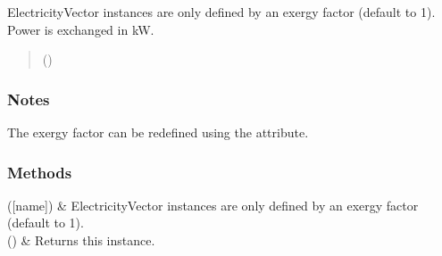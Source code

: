 \documentclass[letterpaper,10pt,english]{sphinxmanual}
\begin{document}
\begin{fulllineitems}
\label{\detokenize{generated/tamos.element.ElectricityVector:tamos.element.ElectricityVector}}
\pysigstartsignatures
{}
\pysigstopsignatures{}

\begin{fulllineitems}
\label{\detokenize{generated/tamos.element.ElectricityVector:tamos.element.ElectricityVector.__init__}}
\pysigstartsignatures
{}
\pysigstopsignatures
\sphinxAtStartPar
ElectricityVector instances are only defined by an exergy factor (default to 1).
Power is exchanged in kW.
\begin{quote}\begin{description}
\sphinxAtStartPar
{} (\sphinxstyleliteralemphasis{\sphinxupquote{, }}) \textendash{} 

\end{description}\end{quote}
\subsubsection*{Notes}

\sphinxAtStartPar
The exergy factor can be redefined using the  attribute.

\end{fulllineitems}

\subsubsection*{Methods}


\begin{savenotes}\sphinxattablestart
\centering
\begin{tabulary}{\linewidth}[t]{}
\hline

\sphinxAtStartPar
{\hyperref[\detokenize{generated/tamos.element.ElectricityVector:tamos.element.ElectricityVector.__init__}]{}}({[}name{]})
&
\sphinxAtStartPar
ElectricityVector instances are only defined by an exergy factor (default to 1).
\\
\hline
\sphinxAtStartPar
{\hyperref[\detokenize{generated/tamos.element.ElectricityVector:tamos.element.ElectricityVector.get_vectors}]{}}()
&
\sphinxAtStartPar
Returns this instance.
\\
\hline
\end{tabulary}
\par
\sphinxattableend\end{savenotes}

\end{fulllineitems}
\end{document}
